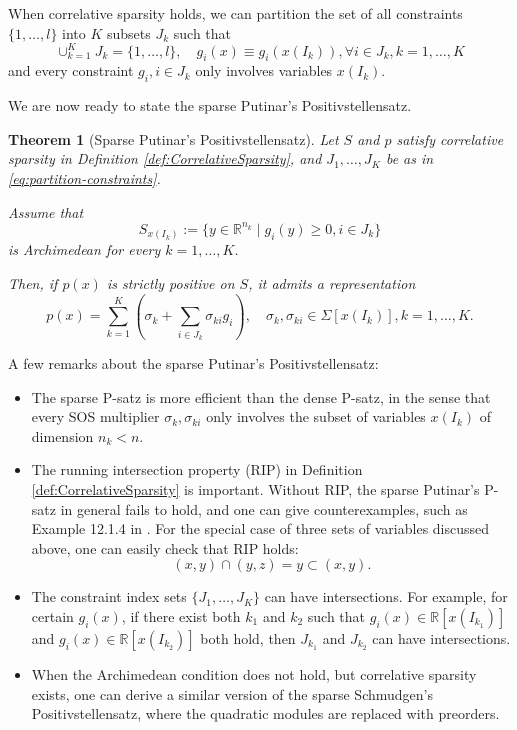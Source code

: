 \documentclass[
]{book}
\newtheorem{theorem}{Theorem}[chapter]
\theoremstyle{definition}
\theoremstyle{definition}
\theoremstyle{definition}
\theoremstyle{definition}
\theoremstyle{remark}
\begin{document}
When correlative sparsity holds, we can partition the set of all constraints \(\{ 1,\dots,l \}\) into \(K\) subsets \(J_k\) such that
\begin{equation}
\cup_{k=1}^K J_k = \{ 1,\dots,l \}, \quad g_i(x) \equiv g_i(x(I_k)), \forall i \in J_k, k=1,\dots,K
\label{eq:partition-constraints}
\end{equation}
and every constraint \(g_i, i \in J_k\) only involves variables \(x(I_k)\).

We are now ready to state the sparse Putinar's Positivstellensatz.

\begin{theorem}[Sparse Putinar's Positivstellensatz]
\protect\hypertarget{thm:SparsePutinar}{}\label{thm:SparsePutinar}Let \(S\) and \(p\) satisfy correlative sparsity in Definition \ref{def:CorrelativeSparsity}, and \(J_1,\dots,J_K\) be as in \eqref{eq:partition-constraints}.

Assume that
\[
S_{x(I_k)} := \{  y \in \mathbb{R}^{n_k} \mid g_i(y) \geq 0, i \in J_k  \}
\]
is Archimedean for every \(k=1,\dots,K\).

Then, if \(p(x)\) is strictly positive on \(S\), it admits a representation
\[
p(x) = \sum_{k=1}^K \left( \sigma_k + \sum_{i \in J_k} \sigma_{ki} g_i  \right), \quad \sigma_k, \sigma_{ki} \in \Sigma[x(I_k)], k=1,\dots,K.
\]
\end{theorem}

A few remarks about the sparse Putinar's Positivstellensatz:

\begin{itemize}
\item
  The sparse P-satz is more efficient than the dense P-satz, in the sense that every SOS multiplier \(\sigma_k, \sigma_{ki}\) only involves the subset of variables \(x(I_k)\) of dimension \(n_k < n\).
\item
  The running intersection property (RIP) in Definition \ref{def:CorrelativeSparsity} is important. Without RIP, the sparse Putinar's P-satz in general fails to hold, and one can give counterexamples, such as Example 12.1.4 in \citep{nie23book-moment}. For the special case of three sets of variables discussed above, one can easily check that RIP holds:
  \[
  (x,y) \cap (y,z) = y \subset (x,y).
  \]
\item
  The constraint index sets \(\{ J_1,\dots,J_K \}\) can have intersections. For example, for certain \(g_i(x)\), if there exist both \(k_1\) and \(k_2\) such that \(g_i(x) \in \mathbb{R}[x(I_{k_1})]\) and \(g_i(x) \in \mathbb{R}[x(I_{k_2})]\) both hold, then \(J_{k_1}\) and \(J_{k_2}\) can have intersections.
\item
  When the Archimedean condition does not hold, but correlative sparsity exists, one can derive a similar version of the sparse Schmudgen's Positivstellensatz, where the quadratic modules are replaced with preorders.
\end{itemize}
\end{document}
